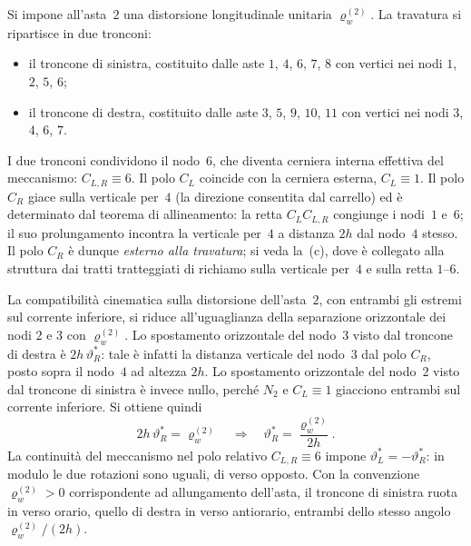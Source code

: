 \begin{esempio}
\begin{svolgimento}
		Si impone all'asta~$2$ una distorsione longitudinale unitaria
		$\varrho_w^{(2)}$. La travatura si ripartisce in due tronconi:
		\begin{itemize}[noitemsep,topsep=2pt]
			\item il troncone di sinistra, costituito dalle aste
			$1$, $4$, $6$, $7$, $8$ con vertici nei nodi $1$, $2$, $5$, $6$;
			\item il troncone di destra, costituito dalle aste
			$3$, $5$, $9$, $10$, $11$ con vertici nei nodi $3$, $4$, $6$, $7$.
		\end{itemize}
		I due tronconi condividono il nodo~$6$, che diventa cerniera
		interna effettiva del meccanismo: $C_{L,R}\equiv 6$. Il polo
		$C_L$ coincide con la cerniera esterna, $C_L\equiv 1$. Il polo
		$C_R$ giace sulla verticale per~$4$ (la direzione consentita
		dal carrello) ed è determinato dal teorema di allineamento: la
		retta $C_L C_{L,R}$ congiunge i nodi~$1$ e~$6$; il suo
		prolungamento incontra la verticale per~$4$ a distanza $2h$ dal
		nodo~$4$ stesso. Il polo $C_R$ è dunque \emph{esterno alla
			travatura}; si veda la \,(c), dove è
		collegato alla struttura dai tratti tratteggiati di richiamo
		sulla verticale per~$4$ e sulla retta $1$--$6$.
		
		La compatibilità cinematica sulla distorsione dell'asta~$2$, con
		entrambi gli estremi sul corrente inferiore, si riduce
		all'uguaglianza della separazione orizzontale dei nodi $2$ e $3$
		con $\varrho_w^{(2)}$.
		Lo spostamento orizzontale del nodo~$3$ visto dal troncone di
		destra è $2h\,\vartheta_R^*$: tale è infatti la distanza verticale
		del nodo~$3$ dal polo $C_R$, posto sopra il nodo~$4$ ad altezza
		$2h$. Lo spostamento orizzontale del nodo~$2$ visto dal troncone
		di sinistra è invece nullo, perché $N_2$ e $C_L\equiv 1$ giacciono
		entrambi sul corrente inferiore. Si ottiene quindi
		\begin{equation*}
			2h\,\vartheta_R^* = \varrho_w^{(2)}
			\quad\Longrightarrow\quad
			\vartheta_R^* = \frac{\varrho_w^{(2)}}{2h}.
		\end{equation*}
		La continuità del meccanismo nel polo relativo $C_{L,R}\equiv 6$
		impone $\vartheta_L^* = -\vartheta_R^*$: in modulo le due
		rotazioni sono uguali, di verso opposto. Con la convenzione
		$\varrho_w^{(2)}>0$ corrispondente ad allungamento dell'asta, il
		troncone di sinistra ruota in verso orario, quello di destra in
		verso antiorario, entrambi dello stesso angolo
		$\varrho_w^{(2)}/(2h)$.
		

\end{svolgimento}
\end{esempio}
